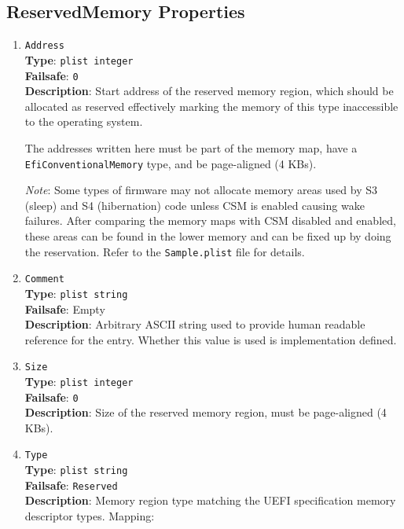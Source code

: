 \documentclass[]{article}
\begin{document}
\subsection{ReservedMemory Properties}\label{uefirsvdprops}

\begin{enumerate}

\item
  \texttt{Address}\\
  \textbf{Type}: \texttt{plist\ integer}\\
  \textbf{Failsafe}: \texttt{0}\\
  \textbf{Description}: Start address of the reserved memory region, which should be allocated
  as reserved effectively marking the memory of this type inaccessible to the operating system.

  The addresses written here must be part of the memory map, have a \texttt{EfiConventionalMemory}
  type, and be page-aligned (4 KBs).

  \emph{Note}: Some types of firmware may not allocate memory areas used by S3 (sleep) and S4 (hibernation)
  code unless CSM is enabled causing wake failures. After comparing the memory maps with CSM disabled
  and enabled, these areas can be found in the lower memory and can be fixed up by doing the reservation.
  Refer to the \texttt{Sample.plist} file for details.

\item
  \texttt{Comment}\\
  \textbf{Type}: \texttt{plist\ string}\\
  \textbf{Failsafe}: Empty\\
  \textbf{Description}: Arbitrary ASCII string used to provide human readable
  reference for the entry. Whether this value is used is implementation defined.

\item
  \texttt{Size}\\
  \textbf{Type}: \texttt{plist\ integer}\\
  \textbf{Failsafe}: \texttt{0}\\
  \textbf{Description}: Size of the reserved memory region, must be page-aligned (4 KBs).

\item
  \texttt{Type}\\
  \textbf{Type}: \texttt{plist\ string}\\
  \textbf{Failsafe}: \texttt{Reserved}\\
  \textbf{Description}: Memory region type matching the UEFI specification memory descriptor
  types. Mapping:


\end{enumerate}
\end{document}
